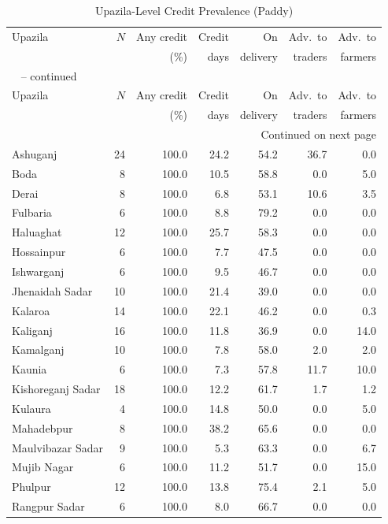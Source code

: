 \begin{longtable}{lrrrrrr}
\caption{Upazila-Level Credit Prevalence (Paddy)} \label{tab:upazila} \\
\toprule
Upazila & $N$ & Any credit & Credit & On & Adv.\ to & Adv.\ to \\
& & (\%) & days & delivery & traders & farmers \\
\midrule
\endfirsthead
\multicolumn{7}{l}{\tablename\ \thetable{} -- continued} \\
\toprule
Upazila & $N$ & Any credit & Credit & On & Adv.\ to & Adv.\ to \\
& & (\%) & days & delivery & traders & farmers \\
\midrule
\endhead
\midrule \multicolumn{7}{r}{\footnotesize Continued on next page} \\
\endfoot
\bottomrule
\endlastfoot
Ashuganj & 24 & 100.0 & 24.2 & 54.2 & 36.7 & 0.0 \\
Boda & 8 & 100.0 & 10.5 & 58.8 & 0.0 & 5.0 \\
Derai & 8 & 100.0 & 6.8 & 53.1 & 10.6 & 3.5 \\
Fulbaria & 6 & 100.0 & 8.8 & 79.2 & 0.0 & 0.0 \\
Haluaghat & 12 & 100.0 & 25.7 & 58.3 & 0.0 & 0.0 \\
Hossainpur & 6 & 100.0 & 7.7 & 47.5 & 0.0 & 0.0 \\
Ishwarganj & 6 & 100.0 & 9.5 & 46.7 & 0.0 & 0.0 \\
Jhenaidah Sadar & 10 & 100.0 & 21.4 & 39.0 & 0.0 & 0.0 \\
Kalaroa & 14 & 100.0 & 22.1 & 46.2 & 0.0 & 0.3 \\
Kaliganj & 16 & 100.0 & 11.8 & 36.9 & 0.0 & 14.0 \\
Kamalganj & 10 & 100.0 & 7.8 & 58.0 & 2.0 & 2.0 \\
Kaunia & 6 & 100.0 & 7.3 & 57.8 & 11.7 & 10.0 \\
Kishoreganj Sadar & 18 & 100.0 & 12.2 & 61.7 & 1.7 & 1.2 \\
Kulaura & 4 & 100.0 & 14.8 & 50.0 & 0.0 & 5.0 \\
Mahadebpur & 8 & 100.0 & 38.2 & 65.6 & 0.0 & 0.0 \\
Maulvibazar Sadar & 9 & 100.0 & 5.3 & 63.3 & 0.0 & 6.7 \\
Mujib Nagar & 6 & 100.0 & 11.2 & 51.7 & 0.0 & 15.0 \\
Phulpur & 12 & 100.0 & 13.8 & 75.4 & 2.1 & 5.0 \\
Rangpur Sadar & 6 & 100.0 & 8.0 & 66.7 & 0.0 & 0.0 \\

\end{longtable}
